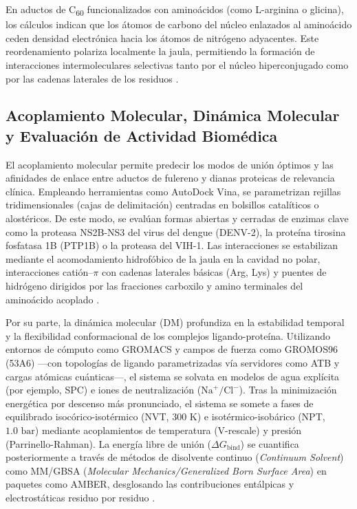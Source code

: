 En aductos de C\textsubscript{60} funcionalizados con aminoácidos (como L-arginina o glicina), los cálculos indican que los átomos de carbono del núcleo enlazados al aminoácido ceden densidad electrónica hacia los átomos de nitrógeno adyacentes. Este reordenamiento polariza localmente la jaula, permitiendo la formación de interacciones intermoleculares selectivas tanto por el núcleo hiperconjugado como por las cadenas laterales de los residuos \cite{moncada2008caracterizacion, gaur2021biomedical}.

\subsection{Acoplamiento Molecular, Dinámica Molecular y Evaluación de Actividad Biomédica}
El acoplamiento molecular permite predecir los modos de unión óptimos y las afinidades de enlace entre aductos de fulereno y dianas proteicas de relevancia clínica. Empleando herramientas como AutoDock Vina, se parametrizan rejillas tridimensionales (cajas de delimitación) centradas en bolsillos catalíticos o alostéricos. De este modo, se evalúan formas abiertas y cerradas de enzimas clave como la proteasa NS2B-NS3 del virus del dengue (DENV-2), la proteína tirosina fosfatasa 1B (PTP1B) o la proteasa del VIH-1. Las interacciones se estabilizan mediante el acomodamiento hidrofóbico de la jaula en la cavidad no polar, interacciones catión--$\pi$ con cadenas laterales básicas (Arg, Lys) y puentes de hidrógeno dirigidos por las fracciones carboxilo y amino terminales del aminoácido acoplado \cite{nelson2022principios,jiang2015synthesis, wang2024strain}.

Por su parte, la dinámica molecular (DM) profundiza en la estabilidad temporal y la flexibilidad conformacional de los complejos ligando-proteína. Utilizando entornos de cómputo como GROMACS y campos de fuerza como GROMOS96 (53A6) —con topologías de ligando parametrizadas vía servidores como ATB y cargas atómicas cuánticas—, el sistema se solvata en modelos de agua explícita (por ejemplo, SPC) e iones de neutralización ($\text{Na}^+/\text{Cl}^-$). Tras la minimización energética por descenso más pronunciado, el sistema se somete a fases de equilibrado isocórico-isotérmico (NVT, $300\text{ K}$) e isotérmico-isobárico (NPT, $1.0\text{ bar}$) mediante acoplamientos de temperatura (V-rescale) y presión (Parrinello-Rahman). La energía libre de unión ($\Delta G_{\text{bind}}$) se cuantifica posteriormente a través de métodos de disolvente continuo (\textit{Continuum Solvent}) como MM/GBSA (\textit{Molecular Mechanics/Generalized Born Surface Area}) en paquetes como AMBER, desglosando las contribuciones entálpicas y electrostáticas residuo por residuo \cite{nelson2022principios, liu2023fullerene}.

